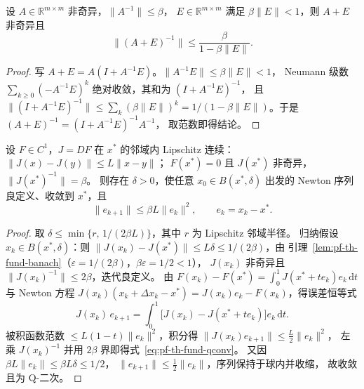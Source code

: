 \begin{lemma}\label{lem:pf-th-fund-banach}
设 $A\in\mathbb R^{m\times m}$ 非奇异，$\lVert A^{-1}\rVert\le\beta$，
$E\in\mathbb R^{m\times m}$ 满足 $\beta\lVert E\rVert<1$，则 $A+E$ 非奇异且
\begin{equation}
\bigl\lVert(A+E)^{-1}\bigr\rVert\le\frac{\beta}{1-\beta\lVert E\rVert}.
\end{equation}
\end{lemma}

\begin{proof}
写 $A+E=A(I+A^{-1}E)$。$\lVert A^{-1}E\rVert\le\beta\lVert E\rVert<1$，
Neumann 级数 $\sum_{k\ge0}(-A^{-1}E)^k$ 绝对收敛，其和为 $(I+A^{-1}E)^{-1}$，
且 $\lVert(I+A^{-1}E)^{-1}\rVert\le\sum_k(\beta\lVert E\rVert)^k
=1/(1-\beta\lVert E\rVert)$。于是 $(A+E)^{-1}=(I+A^{-1}E)^{-1}A^{-1}$，
取范数即得结论。
\end{proof}

\begin{theorem}\label{thm:pf-th-fund-quadratic}
设 $F\in C^1$，$J=DF$ 在 $x^*$ 的邻域内 Lipschitz 连续：
$\lVert J(x)-J(y)\rVert\le L\lVert x-y\rVert$；
$F(x^*)=0$ 且 $J(x^*)$ 非奇异，$\lVert J(x^*)^{-1}\rVert=\beta$。
则存在 $\delta>0$，使任意 $x_0\in B(x^*,\delta)$ 出发的 Newton 序列
良定义、收敛到 $x^*$，且
\begin{equation}
\lVert e_{k+1}\rVert\le\beta L\lVert e_k\rVert^2,
\qquad e_k=x_k-x^* .
\label{eq:pf-th-fund-qconv}
\end{equation}
\end{theorem}

\begin{proof}
取 $\delta\le\min\{r,\,1/(2\beta L)\}$，其中 $r$ 为 Lipschitz 邻域半径。
归纳假设 $x_k\in B(x^*,\delta)$：则
$\lVert J(x_k)-J(x^*)\rVert\le L\delta\le1/(2\beta)$，由
引理~\ref{lem:pf-th-fund-banach}（$\varepsilon=1/(2\beta)$，$\beta\varepsilon=1/2<1$），
$J(x_k)$ 非奇异且 $\lVert J(x_k)^{-1}\rVert\le2\beta$，迭代良定义。
由 $F(x_k)-F(x^*)=\int_0^1J(x^*+te_k)e_k\,\mathrm dt$ 与 Newton 方程
$J(x_k)(x_k+\Delta x_k-x^*)=J(x_k)e_k-F(x_k)$，得误差恒等式
\begin{equation}
J(x_k)\,e_{k+1}
=\int_0^1\bigl[J(x_k)-J(x^*+te_k)\bigr]e_k\,\mathrm dt .
\end{equation}
被积函数范数 $\le L(1-t)\lVert e_k\rVert^2$，积分得
$\lVert J(x_k)e_{k+1}\rVert\le\frac{L}{2}\lVert e_k\rVert^2$，
左乘 $J(x_k)^{-1}$ 并用 $2\beta$ 界即得式~\eqref{eq:pf-th-fund-qconv}。
又因 $\beta L\lVert e_k\rVert\le\beta L\delta\le1/2$，
$\lVert e_{k+1}\rVert\le\frac12\lVert e_k\rVert$，序列保持于球内并收缩，
故收敛且为 Q-二次。
\end{proof}

